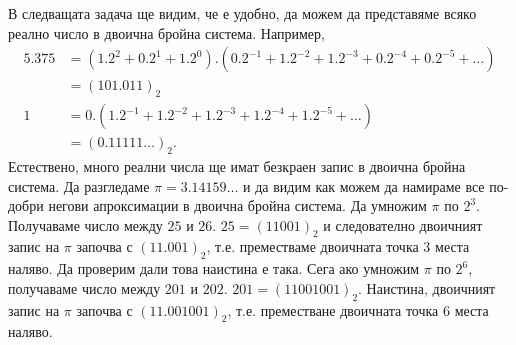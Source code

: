 


В следващата задача ще видим, че е удобно, да можем да представяме 
всяко реално число в двоична бройна система.
Например,
\begin{align*}
  5.375 & = (1.2^2 + 0.2^1 + 1.2^0).(0.2^{-1} + 1.2^{-2} + 1.2^{-3} + 0.2^{-4} + 0.2^{-5} + \dots)\\
  & = (101.011)_2\\
  1 & = 0.(1.2^{-1} + 1.2^{-2} + 1.2^{-3} + 1.2^{-4} + 1.2^{-5} + \dots)\\
  & = (0.11111\dots)_2.
\end{align*}
Естествено, много реални числа ще имат безкраен запис в двоична бройна система.
Да разгледаме $\pi = 3.14159\dots$ и да видим как можем да намираме все по-добри негови 
апроксимации в двоична бройна система.
Да умножим $\pi$ по $2^3$. Получаваме число между $25$ и $26$. 
$25 = (11001)_2$ и следователно двоичният запис на $\pi$ започва с $(11.001)_2$, т.е.
преместваме двоичната точка $3$ места наляво. Да проверим дали това наистина е така.
Сега ако умножим $\pi$ по $2^6$, получаваме число между $201$ и $202$.
$201 = (11001001)_2$. Наистина, двоичният запис на $\pi$ започва с $(11.001001)_2$,
т.е. преместване двоичната точка $6$ места наляво.

